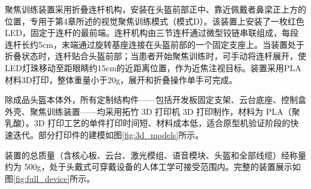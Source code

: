 聚焦训练装置采用折叠连杆机构，安装在头盔前部正中、靠近佩戴者鼻梁正上方的位置，专用于第4章所述的视觉聚焦训练模式（模式D）。该装置上安装了一枚红色LED，固定于连杆的最前端。连杆机构由三节连杆通过微型铰链串联组成，每段连杆长约5cm，末端通过旋转基座连接在头盔前部的一个固定支座上。当装置处于折叠状态时，连杆贴合头盔前部；当患者开始聚焦训练时，可手动将连杆展开，使LED灯珠移动至距眼睛约15cm的近距离位置，作为近焦注视目标。装置采用PLA材料3D打印，整体重量小于20g，展开和折叠操作单手可完成。

除成品头盔本体外，所有定制结构件——包括开发板固定支架、云台底座、控制盒外壳、聚焦训练装置——均采用拓竹 3D 打印机 3D 打印制作，材料为 PLA（聚乳酸）。3D 打印工艺的单件打印时间短、材料成本低，适合原型机验证阶段的快速迭代。部分打印件的建模如图\ref{fig:3d_models}所示。

装置的总质量（含核心板、云台、激光模组、语音模块、头盔和全部线缆）经称量约为 500g，处于头戴式可穿戴设备的人体工学可接受范围内。完整的装置展示如图\ref{fig:full_device}所示。

